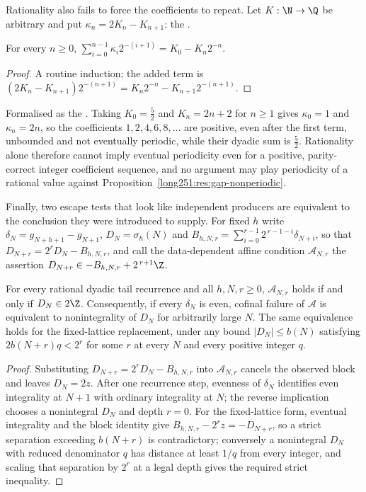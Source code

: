 \documentclass[11pt]{article}
\begin{document}
Rationality also fails to force the coefficients to repeat.  Let $K:\N\to\Q$ be
arbitrary and put $\kappa_n=2K_n-K_{n+1}$: the
.

\begin{proposition}\label{long251:res:telescope}
For every $n\ge0$,
$\sum_{i=0}^{n-1}\kappa_i2^{-(i+1)}=K_0-K_n2^{-n}$.
\end{proposition}

\begin{proof}
A routine induction; the added term is
$(2K_n-K_{n+1})2^{-(n+1)}=K_n2^{-n}-K_{n+1}2^{-(n+1)}$.
\end{proof}

\noindent Formalised as the
.  Taking $K_0=\tfrac52$ and $K_n=2n+2$ for $n\ge1$ gives
$\kappa_0=1$ and $\kappa_n=2n$, so the coefficients $1,2,4,6,8,\ldots$ are
positive, even after the first term, unbounded and not eventually periodic,
while their dyadic sum is $\tfrac52$.  Rationality alone therefore cannot imply
eventual periodicity even for a positive, parity-correct integer coefficient
sequence, and no argument may play periodicity of a rational value against
Proposition~\ref{long251:res:gap-nonperiodic}.

Finally, two escape tests that look like independent producers are equivalent
to the conclusion they were introduced to supply.  For fixed $h$ write
$\delta_N=g_{N+h+1}-g_{N+1}$, $D_N=\sigma_h(N)$ and
$B_{h,N,r}=\sum_{i=0}^{r-1}2^{\,r-1-i}\delta_{N+i}$, so that
$D_{N+r}=2^{r}D_N-B_{h,N,r}$, and call the data-dependent affine condition
$\mathcal A_{N,r}$ the assertion $D_{N+r}\in-B_{h,N,r}+2^{\,r+1}\Z$.

\begin{theorem}\label{long251:res:affinecollapse}
For every rational dyadic tail recurrence and all $h,N,r\ge0$,
$\mathcal A_{N,r}$ holds if and only if $D_N\in2\Z$.  Consequently, if every
$\delta_N$ is even, cofinal failure of $\mathcal A$ is equivalent to
nonintegrality of $D_N$ for arbitrarily large $N$.  The same equivalence holds
for the fixed-lattice replacement, under any bound $|D_N|\le b(N)$ satisfying
$2b(N+r)q<2^{r}$ for some $r$ at every $N$ and every positive integer $q$.
\end{theorem}

\begin{proof}
Substituting $D_{N+r}=2^{r}D_N-B_{h,N,r}$ into $\mathcal A_{N,r}$ cancels the
observed block and leaves $D_N=2z$.  After one recurrence step, evenness of
$\delta_N$ identifies even integrality at $N+1$ with ordinary integrality at
$N$; the reverse implication chooses a nonintegral $D_N$ and depth $r=0$.  For
the fixed-lattice form, eventual integrality and the block identity give
$B_{h,N,r}-2^{r}z=-D_{N+r}$, so a strict separation exceeding $b(N+r)$ is
contradictory; conversely a nonintegral $D_N$ with reduced denominator $q$ has
distance at least $1/q$ from every integer, and scaling that separation by
$2^{r}$ at a legal depth gives the required strict inequality.
\end{proof}
\end{document}

